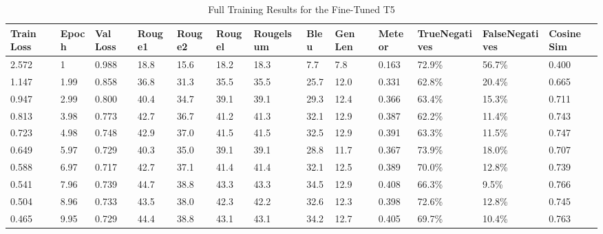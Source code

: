 \begin{appendices}
\begin{table}[!ht]
\begin{adjustwidth}{-1.8cm}{}
  \centering
  \begin{tabular}{p{0.8cm}|l|p{0.8cm}|l|l|l|p{1.1cm}|l|p{0.7cm}|l|p{1.5cm}|p{1.5cm}|p{1.2cm}}
        \textbf{Train Loss} & \textbf{Epoch} & \textbf{Val Loss} & \textbf{Rouge1} & \textbf{Rouge2} & \textbf{Rougel} & \textbf{Rougelsum} & \textbf{Bleu} & \textbf{Gen Len} & \textbf{Meteor} & \textbf{True\newline Negatives} & \textbf{False\newline Negatives} & \textbf{Cosine Sim} \\ \hline
        2.572 & 1 & 0.988 & 18.8 & 15.6 & 18.2 & 18.3 & 7.7 & 7.8 & 0.163 & 72.9\% & 56.7\% & 0.400 \\ \hline
        1.147 & 1.99 & 0.858 & 36.8 & 31.3 & 35.5 & 35.5 & 25.7 & 12.0 & 0.331 & 62.8\% & 20.4\% & 0.665 \\ \hline
        0.947 & 2.99 & 0.800 & 40.4 & 34.7 & 39.1 & 39.1 & 29.3 & 12.4 & 0.366 & 63.4\% & 15.3\% & 0.711 \\ \hline
        0.813 & 3.98 & 0.773 & 42.7 & 36.7 & 41.2 & 41.3 & 32.1 & 12.9 & 0.387 & 62.2\% & 11.4\% & 0.743 \\ \hline
        0.723 & 4.98 & 0.748 & 42.9 & 37.0 & 41.5 & 41.5 & 32.5 & 12.9 & 0.391 & 63.3\% & 11.5\% & 0.747 \\ \hline
        0.649 & 5.97 & 0.729 & 40.3 & 35.0 & 39.1 & 39.1 & 28.8 & 11.7 & 0.367 & 73.9\% & 18.0\% & 0.707 \\ \hline
        0.588 & 6.97 & 0.717 & 42.7 & 37.1 & 41.4 & 41.4 & 32.1 & 12.5 & 0.389 & 70.0\% & 12.8\% & 0.739 \\ \hline
        0.541 & 7.96 & 0.739 & 44.7 & 38.8 & 43.3 & 43.3 & 34.5 & 12.9 & 0.408 & 66.3\% & 9.5\% & 0.766 \\ \hline
        0.504 & 8.96 & 0.733 & 43.5 & 38.0 & 42.3 & 42.2 & 32.6 & 12.3 & 0.398 & 72.6\% & 12.8\% & 0.745 \\ \hline
        0.465 & 9.95 & 0.729 & 44.4 & 38.8 & 43.1 & 43.1 & 34.2 & 12.7 & 0.405 & 69.7\% & 10.4\% & 0.763 \\
  \end{tabular}
  \caption{Full Training Results for the Fine-Tuned T5}
  \label{tab:full_t5_results}
\end{adjustwidth}
\end{table}


\end{appendices}